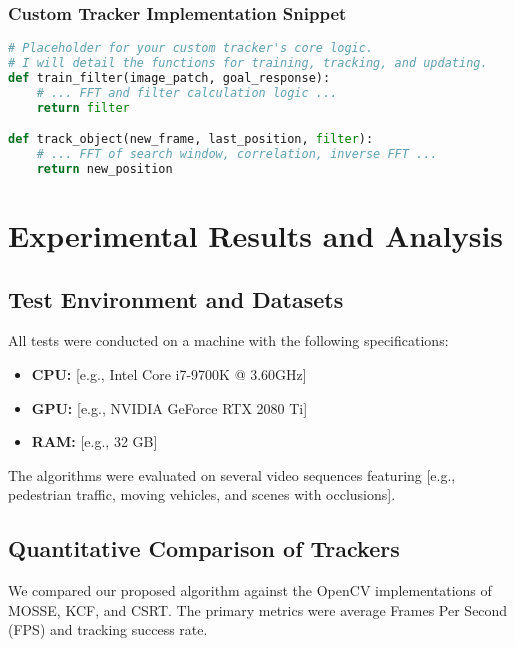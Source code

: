 \documentclass[12pt, a4paper]{report}
\begin{document}
\subsection{Custom Tracker Implementation Snippet}
\begin{lstlisting}[language=Python, caption={Key function from your custom tracker implementation.}]
# Placeholder for your custom tracker's core logic.
# I will detail the functions for training, tracking, and updating.
def train_filter(image_patch, goal_response):
    # ... FFT and filter calculation logic ...
    return filter

def track_object(new_frame, last_position, filter):
    # ... FFT of search window, correlation, inverse FFT ...
    return new_position
\end{lstlisting}



\chapter{Experimental Results and Analysis}

\section{Test Environment and Datasets}
All tests were conducted on a machine with the following specifications:
\begin{itemize}
    \item \textbf{CPU:} [e.g., Intel Core i7-9700K @ 3.60GHz]
    \item \textbf{GPU:} [e.g., NVIDIA GeForce RTX 2080 Ti]
    \item \textbf{RAM:} [e.g., 32 GB]
\end{itemize}
The algorithms were evaluated on several video sequences featuring [e.g., pedestrian traffic, moving vehicles, and scenes with occlusions].

\section{Quantitative Comparison of Trackers}
We compared our proposed algorithm against the OpenCV implementations of MOSSE, KCF, and CSRT. The primary metrics were average Frames Per Second (FPS) and tracking success rate.
\end{document}
